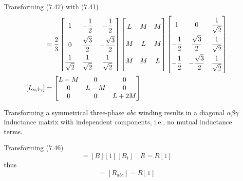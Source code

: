\documentclass[a4paper,numbers=noenddot,12pt]{scrbook}
\begin{document}
        Transforming (7.47) with (7.41)
        \begin{align}
            [L_{\alpha \beta \gamma}] & = \dfrac{2}{3}
            \begin{bmatrix}
                1 & - \dfrac{1}{2} & - \dfrac{1}{2} \\[2ex]
                0 & \dfrac{\sqrt{3}}{2} & - \dfrac{\sqrt{3}}{2} \\[2ex]
                \dfrac{1}{\sqrt{2}} & \dfrac{1}{\sqrt{2}} & \dfrac{1}{\sqrt{2}}
            \end{bmatrix}
            \begin{bmatrix}
                L \vphantom{\dfrac{1}{\sqrt{2}}} & M & M \\[2ex]
                M \vphantom{\dfrac{1}{\sqrt{2}}} & L & M \\[2ex]
                M \vphantom{\dfrac{1}{\sqrt{2}}} & M & L
            \end{bmatrix}
            \begin{bmatrix}
                1 & 0 & \dfrac{1}{\sqrt{2}} \\[2ex]
                - \dfrac{1}{2} & \dfrac{\sqrt{3}}{2} & \dfrac{1}{\sqrt{2}} \\[2ex]
                - \dfrac{1}{2} & - \dfrac{\sqrt{3}}{2} & \dfrac{1}{\sqrt{2}}
            \end{bmatrix} \nonumber \\
            [L_{\alpha \beta \gamma}] & =
            \begin{bmatrix}
                L - M & 0 & 0 \\
                0 & L - M & 0 \\
                0 & 0 & L + 2M 
            \end{bmatrix}
        \end{align}

        Transforming a symmetrical three-phase $abc$ winding results in a diagonal $\alpha \beta \gamma$ inductance matrix with independent components, i.e., no mutual inductance terms.

        Transforming (7.46)
        \begin{equation*}
            [R_{\alpha \beta \gamma}] = [B] [1] [B_t] \quad R = R[1]
        \end{equation*}
        thus
        \begin{equation}
            [R_{\alpha \beta \gamma}] = [R_{abc}] = R[1]
            \label{eq:Eq7.49}
        \end{equation}
\end{document}
